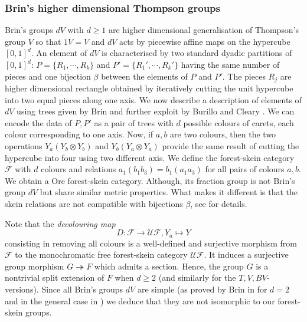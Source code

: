 \documentclass[a4paper, 12pt]{amsart}
\numberwithin{equation}{section}
\theoremstyle{definition}
\newcommand{\cF}{\mathcal F}
\newcommand{\onto}{\twoheadrightarrow}
\newcommand{\ot}{\otimes}
\newcommand{\cUF}{\mathcal{UF}}
\begin{document}
\subsubsection{Brin's higher dimensional Thompson groups}
Brin's groups $dV$ with $d\geq 1$ are higher dimensional generalisation of Thompson's group $V$ so that $1V=V$ and $dV$ acts by piecewise affine maps on the hypercube $[0,1]^d$.
An element of $dV$ is characterised by two standard dyadic partitions of $[0,1]^d$: $P=\{R_1,\cdots,R_k\}$ and $P'=\{R_1',\cdots,R_k'\}$ having the same number of pieces and one bijection $\beta$ between the elements of $P$ and $P'$.
The pieces $R_j$ are higher dimensional rectangle obtained by iteratively cutting the unit hypercube into two equal pieces along one axis.
We now describe a description of elements of $dV$ using trees given by Brin and further exploit by Burillo and Cleary \cite{Brin-dV1,Burillo-Cleary10}.
We can encode the data of $P,P'$ as a pair of trees with $d$ possible colours of carets, each colour corresponding to one axis. 
Now, if $a,b$ are two colours, then the two operations $Y_a(Y_b\ot Y_b)$ and $Y_b(Y_a\ot Y_a)$ provide the same result of cutting the hypercube into four using two different axis.
We define the forest-skein category $\cF$ with $d$ colours and relations $a_1(b_1b_3)=b_1(a_1a_3)$ for all pairs of colours $a,b$.
We obtain a Ore forest-skein category. Although, its fraction group is not Brin's group $dV$ but share similar metric properties. 
What makes it different is that the skein relations are not compatible with bijections $\beta$, see \cite[Section 1]{Burillo-Cleary10} for details.

Note that the {\it decolouring map} $$D:\cF\to \cUF, Y_a\mapsto Y$$ consisting in removing all colours is a well-defined and surjective morphism from $\cF$ to the monochromatic free forest-skein category $\cUF$.
It induces a surjective group morphism $G\onto F$ which admits a section. 
Hence, the group $G$ is a nontrivial split extension of $F$ when $d\geq 2$ (and similarly for the $T,V,BV$-versions).
Since all Brin's groups $dV$ are simple (as proved by Brin in \cite{Brin-dV1} for $d=2$ and in the general case in \cite{Brin-dV3}) we deduce that they are not isomorphic to our forest-skein groups.
\end{document}
